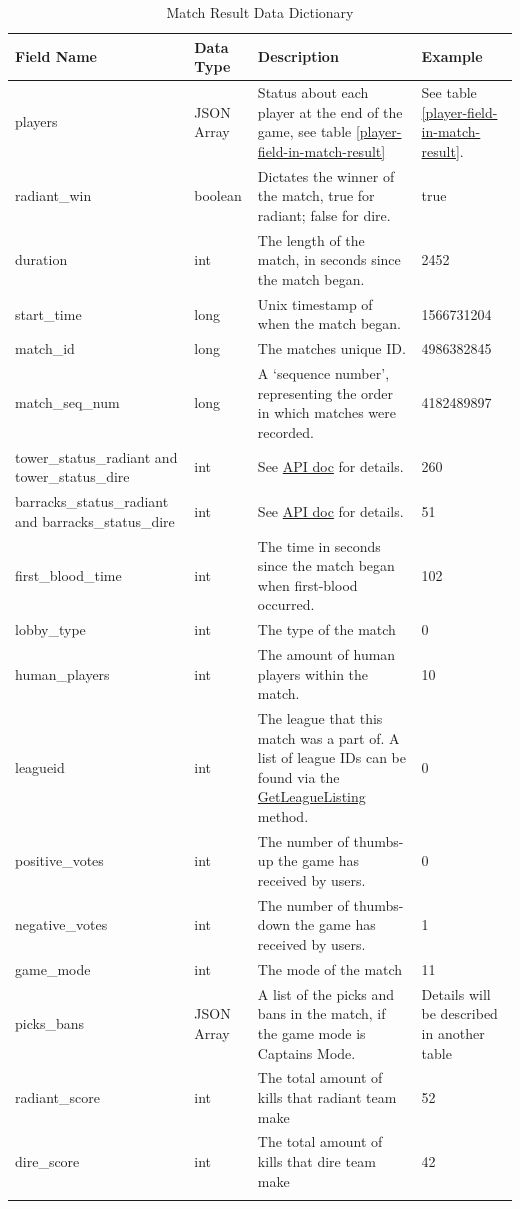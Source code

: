 \documentclass{article}
\begin{document}
\begin{longtable}{|p{2.5cm}|p{2cm}|p{5.5cm}|p{3cm}|}

\hline
\textbf{Field Name} & \textbf{Data Type} & \textbf{Description}  & \textbf{Example}\\
\hline
\endhead

players & JSON Array  & Status about each player at the end of the game, see table \ref{player-field-in-match-result} & See table \ref{player-field-in-match-result}.
\\
\hline
radiant\_win & boolean  & Dictates the winner of the match, true for radiant; false for dire. &true \\
\hline
duration  & int  & The length of the match, in seconds since the match began.  & 2452 \\
\hline
start\_time  & long  & Unix timestamp of when the match began.  & 1566731204 \\
\hline
match\_id  & long  & The matches unique ID.  & 4986382845 \\
\hline
match\_seq\_num  & long  & A `sequence number', representing the order in which matches were recorded.  & 4182489897 \\
\hline
tower\_status\_radiant and tower\_status\_dire  & int  & See \href{https://wiki.teamfortress.com/wiki/WebAPI/GetMatchDetails\#Tower\_Status}{API doc} for details.  & 260 \\
\hline
barracks\_status\_radiant and barracks\_status\_dire  & int  & See \href{https://wiki.teamfortress.com/wiki/WebAPI/GetMatchDetails\#Barracks\_Status}{API doc} for details. & 51 \\
\hline
first\_blood\_time  & int  & The time in seconds since the match began when first-blood occurred.  & 102 \\
\hline
lobby\_type  & int  & The type of the match  & 0 \\
\hline
human\_players  & int  & The amount of human players within the match.  & 10 \\
\hline
leagueid  & int  & The league that this match was a part of. A list of league IDs can be found via the \href{https://wiki.teamfortress.com/wiki/WebAPI/GetLeagueListing}{GetLeagueListing} method.
  & 0 \\
\hline
positive\_votes  & int  & The number of thumbs-up the game has received by users.  & 0 \\
\hline
negative\_votes  & int  & The number of thumbs-down the game has received by users.  & 1 \\
\hline
game\_mode  & int  & The mode of the match  & 11 \\
\hline
picks\_bans  & JSON Array  & A list of the picks and bans in the match, if the game mode is Captains Mode.  & Details will be described in another table \\
\hline
radiant\_score  & int  & The total amount of kills that radiant team make  & 52 \\
\hline
dire\_score  & int  & The total amount of kills that dire team make  & 42 \\
\hline
\caption{Match Result Data Dictionary}
\label{match-result-data-dictionary}
\end{longtable}
\end{document}
